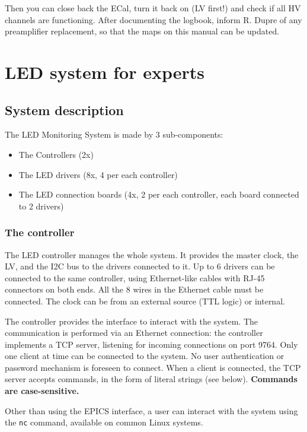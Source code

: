 \documentclass[12pt]{article}
\begin{document}
      Then you can close back the ECal, turn it 
      back on (LV first!) and check if all HV channels are functioning. After documenting the logbook, inform R. Dupre of 
      any preamplifier replacement, so that the maps on this manual can be updated. 

   \section{LED system for experts}

\subsection{System description}

The LED Monitoring System is made by 3 sub-components:

\begin{itemize}
\item{The Controllers (2x)}
\item{The LED drivers (8x, 4 per each controller)}
\item{The LED connection boards (4x, 2 per each controller, each board connected to 2 drivers)}
\end{itemize}

\subsubsection{The controller}

The LED controller manages the whole system. It provides the master clock, the LV, and the I2C bus to the drivers connected to it. Up to 6 drivers can be connected to the same controller, using Ethernet-like cables with RJ-45 connectors on both ends. All the 8 wires in the Ethernet cable must be connected. The clock can be from an external source (TTL logic) or internal.

The controller provides the interface to interact with the system. The communication is performed via an Ethernet connection: the controller implements a TCP server, listening for incoming connections on port 9764. Only one client at time can be connected to the system. No user authentication or password mechanism is foreseen to connect. When a client is connected, the TCP server accepts commands, in the form of literal strings (see below). \textbf{Commands are case-sensitive.}

Other than using the EPICS interface, a user can interact with the system using the \texttt{nc} command, available on common Linux systems.
\end{document}
